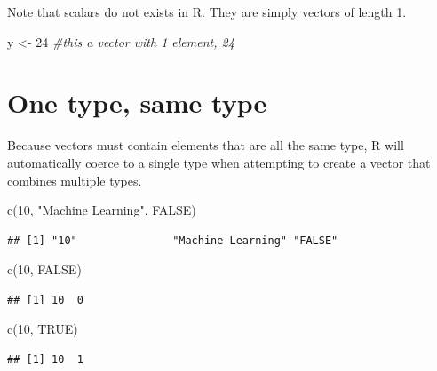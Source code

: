 \documentclass[
]{book}
\newenvironment{Shaded}{\begin{snugshade}}{\end{snugshade}}
\newcommand{\CommentTok}[1]{\textcolor[rgb]{0.56,0.35,0.01}{\textit{#1}}}
\newcommand{\ConstantTok}[1]{\textcolor[rgb]{0.00,0.00,0.00}{#1}}
\newcommand{\DecValTok}[1]{\textcolor[rgb]{0.00,0.00,0.81}{#1}}
\newcommand{\FunctionTok}[1]{\textcolor[rgb]{0.00,0.00,0.00}{#1}}
\newcommand{\NormalTok}[1]{#1}
\newcommand{\OtherTok}[1]{\textcolor[rgb]{0.56,0.35,0.01}{#1}}
\newcommand{\StringTok}[1]{\textcolor[rgb]{0.31,0.60,0.02}{#1}}
\theoremstyle{definition}
\theoremstyle{definition}
\theoremstyle{definition}
\theoremstyle{definition}
\theoremstyle{remark}
\begin{document}
Note that scalars do not exists in R. They are simply vectors of length 1.

\begin{Shaded}
\begin{Highlighting}[]
\NormalTok{y }\OtherTok{\textless{}{-}} \DecValTok{24}  \CommentTok{\#this a vector with 1 element, 24}
\end{Highlighting}
\end{Shaded}

\hypertarget{one-type-same-type}{%
\section{One type, same type}\label{one-type-same-type}}

Because vectors must contain elements that are all the same type, R will automatically coerce to a single type when attempting to create a vector that combines multiple types.

\begin{Shaded}
\begin{Highlighting}[]
\FunctionTok{c}\NormalTok{(}\DecValTok{10}\NormalTok{, }\StringTok{"Machine Learning"}\NormalTok{, }\ConstantTok{FALSE}\NormalTok{)}
\end{Highlighting}
\end{Shaded}

\begin{verbatim}
## [1] "10"               "Machine Learning" "FALSE"
\end{verbatim}

\begin{Shaded}
\begin{Highlighting}[]
\FunctionTok{c}\NormalTok{(}\DecValTok{10}\NormalTok{, }\ConstantTok{FALSE}\NormalTok{)}
\end{Highlighting}
\end{Shaded}

\begin{verbatim}
## [1] 10  0
\end{verbatim}

\begin{Shaded}
\begin{Highlighting}[]
\FunctionTok{c}\NormalTok{(}\DecValTok{10}\NormalTok{, }\ConstantTok{TRUE}\NormalTok{)}
\end{Highlighting}
\end{Shaded}

\begin{verbatim}
## [1] 10  1
\end{verbatim}
\end{document}
